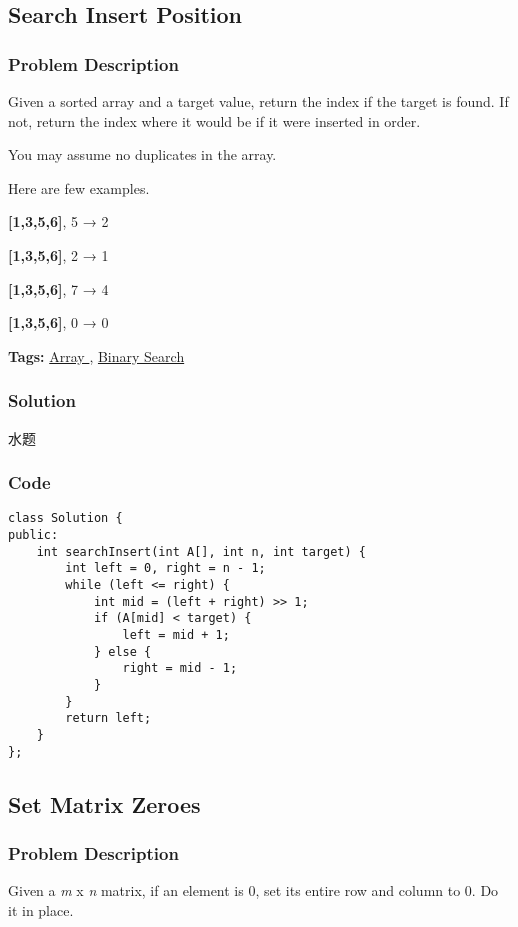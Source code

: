 \documentclass{article}
\begin{document}
\begin{CJK*}{UTF8}{gkai}
\subsection{ Search Insert Position }
\label{ Search Insert Position }

\subsubsection*{Problem Description}
Given a sorted array and a target value, return the index if the target is found. If not, return the index where it would be if it were inserted in order.

You may assume no duplicates in the array.

Here are few examples.


\textbf{[1,3,5,6]}, 5 → 2


\textbf{[1,3,5,6]}, 2 → 1


\textbf{[1,3,5,6]}, 7 → 4


\textbf{[1,3,5,6]}, 0 → 0


\textbf{Tags: }
\hyperref[ Array ]{ Array },  \hyperref[ Binary Search ]{ Binary Search }



\subsubsection*{Solution}
水题

\subsubsection*{Code}
\begin{lstlisting}
class Solution {
public:
    int searchInsert(int A[], int n, int target) {
        int left = 0, right = n - 1;
        while (left <= right) {
            int mid = (left + right) >> 1;
            if (A[mid] < target) {
                left = mid + 1;
            } else {
                right = mid - 1;
            }
        }
        return left;
    }
}; 
\end{lstlisting}


\subsection{ Set Matrix Zeroes }
\label{ Set Matrix Zeroes }

\subsubsection*{Problem Description}
Given a \emph{m} x \emph{n} matrix, if an element is 0, set its entire row and column to 0. Do it in place.


\end{CJK*}
\end{document}
